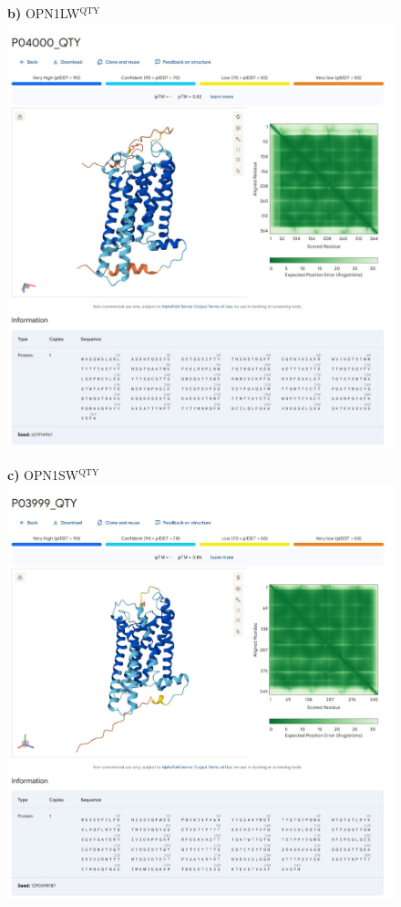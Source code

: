 \documentclass[fleqn,12pt]{supp}
\begin{document}
\newpage
\begin{figure}[H]
    \textbf{b)} OPN1LW$^{\textrm{QTY}}$ \\
    \includegraphics[width=\linewidth]{FigureS2b.jpg}
\end{figure}

\newpage
\begin{figure}[H]
    \textbf{c)} OPN1SW$^{\textrm{QTY}}$ \\
    \includegraphics[width=\linewidth]{FigureS2c.jpg}
\end{figure}
\end{document}

